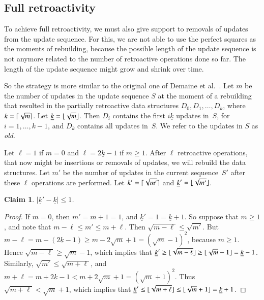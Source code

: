 \documentclass[3p,times,procedia]{elsarticle}
\DeclarePairedDelimiter\ceil{\lceil}{\rceil}
\DeclarePairedDelimiter\floor{\lfloor}{\rfloor}
\newtheorem{claim}	[theorem] {Claim}
\begin{document}
\subsection{Full retroactivity}\label{subsec:fully}

To achieve full retroactivity, 
we must also give support to removals of updates from the update sequence.  
For this, we are not able to use the perfect squares as the moments 
of rebuilding, because the possible length of the update sequence is
not anymore related to the number of retroactive operations done so far. 
The length of the update sequence might grow and shrink over time. 

So the strategy is more similar to the original one of Demaine et al.~\cite{DemaineIL2007}. 
Let $m$ be the number of updates in the update sequence $S$ at the
moment of a rebuilding that resulted in the partially retroactive 
data structures $D_0,D_1,\ldots,D_k$, where $k=\ceil{\sqrt{m}}$.
Let $\underline{k} = \floor{\sqrt{m}}$.
Then $D_i$ contains the first $i\underline{k}$ updates in~$S$, 
for $i=1,\ldots,k-1$, and $D_k$ contains all updates in~$S$. 
We refer to the updates in $S$ as \emph{old}.

Let $\ell=1$ if $m = 0$ and $\ell=2\underline{k}-1$ if $m \geq 1$. 
After $\ell$ retroactive operations, that now might be insertions 
or removals of updates, we will rebuild the data structures.
Let $m'$ be the number of updates in the current sequence~$S'$ 
after these $\ell$ operations are performed. 
Let $k'= \ceil{\sqrt{m'}}$ and $\underline{k}' = \floor{\sqrt{m'}}$. 

\begin{claim}
  $|\underline{k}' - \underline{k}| \leq 1$.
\end{claim}
\begin{proof}
  If $m = 0$, then $m' = m + 1 = 1$, and $\underline{k}' = 1 = \underline{k}+1$.
  So suppose that $m \geq 1$, and note that $m-\ell \leq m' \leq m+\ell$.  
  Then $\sqrt{m-\ell} \leq \sqrt{m'}$.  
  But $m-\ell = m - (2\underline{k}-1) \geq m - 2\sqrt{m} + 1 = (\sqrt{m}-1)^2$, 
  because $m \geq 1$. 
  Hence $\sqrt{m-\ell} \geq \sqrt{m}-1$, 
  which implies that 
  $\underline{k}' \geq \floor{\sqrt{m-\ell}} \geq \floor{\sqrt{m}-1} = \underline{k}-1$. 
  Similarly, $\sqrt{m'} \leq \sqrt{m+\ell}$, and
  $m+\ell = m + 2\underline{k}-1 < m + 2\sqrt{m} + 1 = (\sqrt{m}+1)^2$. 
  Thus $\sqrt{m+\ell} < \sqrt{m}+1$, 
  which implies that 
  $\underline{k}' \leq \floor{\sqrt{m+\ell}} \leq \floor{\sqrt{m}+1} = \underline{k}+1$. 
\end{proof}
\end{document}
